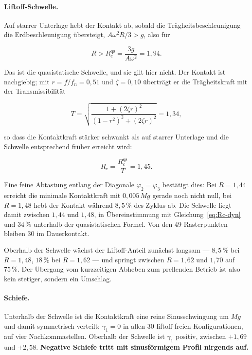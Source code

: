 \documentclass[12pt,a4paper]{report}
\begin{document}
\paragraph{Liftoff-Schwelle.}
Auf starrer Unterlage hebt der Kontakt ab, sobald die
Trägheitsbeschleunigung die Erdbeschleunigung übersteigt,
$A \omega^{2} R / 3 > g$, also für

\begin{equation}
R > R_c^{\mathrm{qs}} = \frac{3g}{A\omega^{2}} = 1{,}94 .
\label{eq:Rc}
\end{equation}

Das ist die quasistatische Schwelle, und sie gilt hier nicht. Der
Kontakt ist nachgiebig; mit $r = f/f_n = 0{,}51$ und $\zeta = 0{,}10$
überträgt er die Trägheitskraft mit der Transmissibilität

\begin{equation}
T = \sqrt{\frac{1 + (2\zeta r)^{2}}{(1-r^{2})^{2} + (2\zeta r)^{2}}} = 1{,}34 ,
\label{eq:transmissibilitaet}
\end{equation}

so dass die Kontaktkraft stärker schwankt als auf starrer Unterlage und
die Schwelle entsprechend früher erreicht wird:

\begin{equation}
R_c = \frac{R_c^{\mathrm{qs}}}{T} = 1{,}45 .
\label{eq:Rc-dyn}
\end{equation}

Eine feine Abtastung entlang der Diagonale $\varphi_2 = \varphi_3$
bestätigt dies: Bei $R = 1{,}44$ erreicht die minimale Kontaktkraft mit
$0{,}005\,Mg$ gerade noch nicht null, bei $R = 1{,}48$ hebt der Kontakt
während $8{,}5\,\%$ des Zyklus ab. Die Schwelle liegt damit zwischen
$1{,}44$ und $1{,}48$, in Übereinstimmung mit
Gleichung~\eqref{eq:Rc-dyn} und $34\,\%$ unterhalb der quasistatischen
Formel. Von den 49 Rasterpunkten bleiben 30 im Dauerkontakt.

Oberhalb der Schwelle wächst der Liftoff-Anteil zunächst langsam ---
$8{,}5\,\%$ bei $R = 1{,}48$, $18\,\%$ bei $R = 1{,}62$ --- und springt
zwischen $R = 1{,}62$ und $1{,}70$ auf $75\,\%$. Der Übergang vom
kurzzeitigen Abheben zum prellenden Betrieb ist also kein stetiger,
sondern ein Umschlag.

\paragraph{Schiefe.}
Unterhalb der Schwelle ist die Kontaktkraft eine reine Sinusschwingung
um $Mg$ und damit symmetrisch verteilt: $\gamma_1 = 0$ in allen 30
liftoff-freien Konfigurationen, auf vier Nachkommastellen. Oberhalb der
Schwelle ist $\gamma_1$ positiv, zwischen $+1{,}69$ und $+2{,}58$.
\textbf{Negative Schiefe tritt mit sinusförmigem Profil nirgends auf.}
\end{document}
